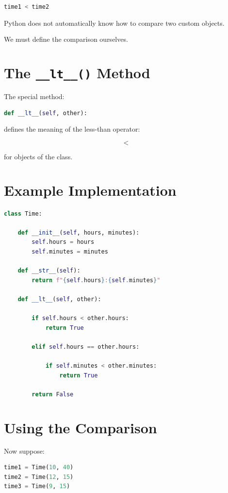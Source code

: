 \documentclass[11pt]{article}
\begin{document}
\begin{lstlisting}[language=Python]
time1 < time2
\end{lstlisting}

Python does not automatically know how to compare two custom objects.

We must define the comparison ourselves.

\section{The \texttt{\_\_lt\_\_()} Method}

The special method:

\begin{lstlisting}[language=Python]
def __lt__(self, other):
\end{lstlisting}

defines the meaning of the less-than operator:

\[
<
\]

for objects of the class.

\section{Example Implementation}

\begin{lstlisting}[language=Python]
class Time:

    def __init__(self, hours, minutes):
        self.hours = hours
        self.minutes = minutes

    def __str__(self):
        return f"{self.hours}:{self.minutes}"

    def __lt__(self, other):

        if self.hours < other.hours:
            return True

        elif self.hours == other.hours:

            if self.minutes < other.minutes:
                return True

        return False
\end{lstlisting}

\section{Using the Comparison}

Now suppose:

\begin{lstlisting}[language=Python]
time1 = Time(10, 40)
time2 = Time(12, 15)
time3 = Time(9, 15)
\end{lstlisting}
\end{document}

